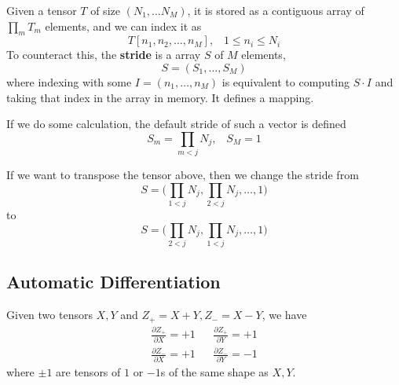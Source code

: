   \begin{definition}[Stride]
    \label{def:stride}
 
    Given a tensor $T$ of size $(N_1, \ldots N_M)$, it is stored as a contiguous array of $\prod_m T_m$ elements, and we can index it as 
    \begin{equation}
      T[n_1, n_2, \ldots, n_M], \;\;\; 1 \leq n_i \leq N_i
    \end{equation} 
    To counteract this, the \textbf{stride} is a array $S$ of $M$ elements, 
    \begin{equation}
      S = (S_1, \ldots, S_M)
    \end{equation} 
    where indexing with some $I = (n_1, \ldots, n_M)$ is equivalent to computing $S \cdot I$ and taking that index in the array in memory. It defines a mapping. 
  \end{definition}

  If we do some calculation, the default stride of such a vector is defined 
  \begin{equation}
    S_m = \prod_{m < j} N_j, \;\;\; S_M = 1
  \end{equation}

  \begin{example}[Transposing]
    \label{ex:transposing}
    If we want to transpose the tensor above, then we change the stride from 
    \begin{equation}
      S = \bigg( \prod_{1 < j} N_j , \prod_{2 < j} N_j, \ldots, 1 \bigg)
    \end{equation} 
    to 
    \begin{equation}
      S = \bigg( \prod_{2 < j} N_j , \prod_{1 < j} N_j, \ldots, 1 \bigg)
    \end{equation} 
  \end{example}

\subsection{Automatic Differentiation} 

  \begin{lemma}[Derivative of $+/-$]
    \label{thm:derivative-of}
    Given two tensors $X, Y$ and $Z_+ = X + Y, Z_{-} = X - Y$, we have 
    \begin{align}
      \frac{\partial Z_+}{\partial X} = +1 && \frac{\partial Z_+}{\partial Y} = +1 \\ 
      \frac{\partial Z_-}{\partial X} = +1 && \frac{\partial Z_-}{\partial Y} = -1 
    \end{align}
    where $\pm1$ are tensors of $1$ or $-1$s of the same shape as $X, Y$. 
  \end{lemma}

